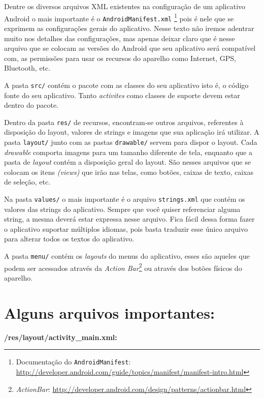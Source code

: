 \documentclass[a4paper,12pt,brazil,oneside]{book}
\begin{document}
\begin{singlespace}
Dentre os diversos arquivos XML existentes na configuração de um aplicativo Android o mais importante é o \texttt{{AndroidManifest.xml}}
\footnote{Documentação do \texttt{AndroidManifest}: \href{The AndroidManifest.xml File}{http://developer.android.com/guide/topics/manifest/manifest-intro.html}}
 pois é nele que se exprimem as configurações gerais do aplicativo. Nesse texto não iremos adentrar muito nos detalhes das configurações, mas apenas deixar claro que é nesse arquivo que se colocam as versões do Android que seu aplicativo será compatível com, as permissões para usar os recursos do aparelho como Internet, GPS, Bluetooth, etc. 
 
 A pasta \texttt{src/} contém o pacote com as classes do seu aplicativo isto é, o código fonte do seu aplicativo. Tanto \emph{activites} como classes de suporte devem estar dentro do pacote.

Dentro da pasta \texttt{res/} de recursos, encontram-se outros arquivos, referentes à disposição do layout, valores de strings e imagens que sua aplicação irá utilizar. A pasta \texttt{layout/} junto com as pastas \texttt{drawable/} servem para dispor o layout. Cada \textit{drawable} comporta imagens para um tamanho diferente de tela, enquanto que a pasta de \textit{layout} contém a disposição geral do layout. São nesses arquivos que se colocam os itens \emph{(views)} que irão nas telas, como botões, caixas de texto, caixas de seleção, etc.

Na pasta \texttt{values/} o mais importante é o arquivo \texttt{strings.xml} que contém os valores das strings do aplicativo. Sempre que você quiser referenciar alguma string, a mesma deverá estar expressa nesse arquivo. Fica fácil dessa forma fazer o aplicativo suportar múltiplos idiomas, pois basta traduzir esse único arquivo para alterar todos os textos do aplicativo.

A pasta \texttt{menu/} contém os \emph{layouts} do menus do aplicativo, esses são aqueles que podem ser acessados através da \emph{Action Bar}\footnote{\emph{ActionBar}: \href{http://developer.android.com/design/patterns/actionbar.html}{http://developer.android.com/design/patterns/actionbar.html}} ou através dos botões físicos do aparelho.

\section{Alguns arquivos importantes:}

\textbf{/res/layout/activity\_main.xml:}


\end{singlespace}
\end{document}
